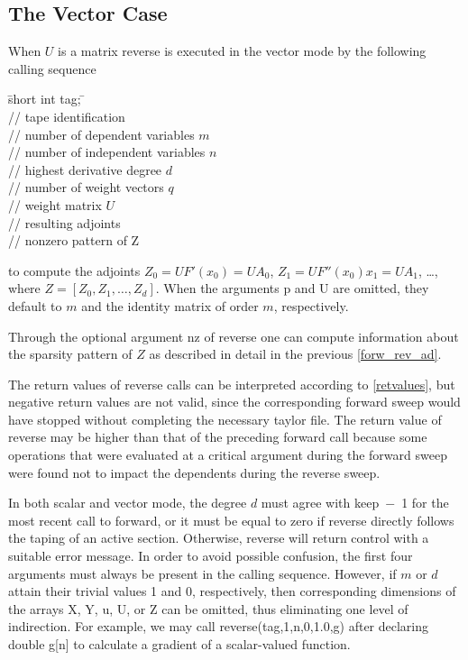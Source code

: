 \documentclass[11pt,twoside]{article}
\begin{document}
\subsection{The Vector Case}
%
\label{vecCas}
%
When $U$ is a matrix {\sf reverse} is executed in the vector mode by the following calling sequence
%
\begin{tabbing}
\hspace{0.5in}\={\sf short int tag;} \hspace{1.1in}\= \kill    %
\\
         \> // tape identification \\
                 \> // number of dependent variables $m$\\
                 \> // number of independent variables $n$\\
                \> // highest derivative degree $d$\\ 
                 \> // number of weight vectors $q$\\
        \> // weight matrix $U$\\
   \> // resulting adjoints \\
        \> // nonzero pattern of {\sf Z}
\end{tabbing}
%
to compute the adjoints $Z_0=U F'(x_0)=U A_0$, $Z_1=U F''(x_0)x_1=U A_1$, 
\ldots, where $Z=[Z_0,Z_1,\ldots,Z_d]$.
When the arguments {\sf p} and {\sf U} are omitted, they default to 
$m$ and the identity matrix of order $m$, respectively.  

Through the optional argument {\sf nz} of {\sf reverse} one can compute
information about the sparsity pattern of $Z$ as described in detail
in the previous \autoref{forw_rev_ad}.

The return values of {\sf reverse} calls can be interpreted according
to \autoref{retvalues}, but negative return values are not
valid, since the corresponding forward sweep would have
stopped without completing the necessary taylor file. 
The return value of {\sf reverse} may be higher 
than that of the preceding {\sf forward} call because some operations 
that were evaluated  at a critical argument during the forward sweep
were found not to impact the dependents during the reverse sweep.

In both scalar and vector mode, the degree $d$ must agree with
{\sf keep}~$-$~1 for the most recent call to {\sf forward}, or it must be
equal to zero if {\sf reverse} directly follows the taping of an active
section. Otherwise, {\sf reverse} will return control with a suitable error
message. 
In order to avoid possible confusion, the first four arguments must always be
present in the calling sequence. However, if $m$ or $d$
attain their trivial values 1 and 0, respectively, then
corresponding dimensions of the arrays {\sf X}, {\sf Y}, {\sf u},
{\sf U}, or {\sf Z} can be omitted, thus eliminating one level of
indirection.  For example, we may call
{\sf reverse(tag,1,n,0,1.0,g)} after declaring
{\sf double g[n]} 
to calculate a gradient of a scalar-valued function.
\end{document}
